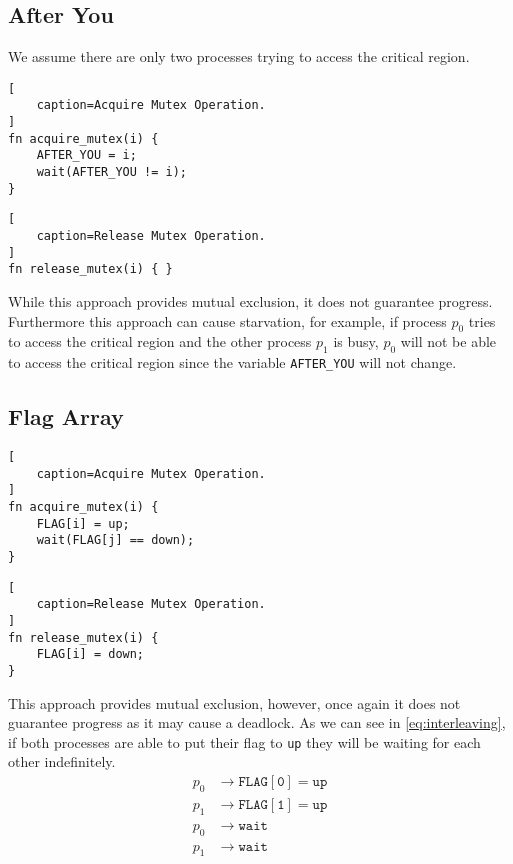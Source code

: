 \subsection{After You}

We assume there are only two processes trying to access the critical region.

\begin{lstlisting}[
    caption=Acquire Mutex Operation.
]
fn acquire_mutex(i) {
    AFTER_YOU = i;
    wait(AFTER_YOU != i);
}
\end{lstlisting}

\begin{lstlisting}[
    caption=Release Mutex Operation.
]
fn release_mutex(i) { }
\end{lstlisting}

While this approach provides mutual exclusion, it does not guarantee progress.
Furthermore this approach can cause starvation, for example,
if process $p_0$ tries to access the critical region and the other process $p_1$ is busy,
$p_0$ will not be able to access the critical region since the variable \texttt{AFTER\_YOU} will not change.

\subsection{Flag Array}

\begin{lstlisting}[
    caption=Acquire Mutex Operation.
]
fn acquire_mutex(i) {
    FLAG[i] = up;
    wait(FLAG[j] == down);
}
\end{lstlisting}

\begin{lstlisting}[
    caption=Release Mutex Operation.
]
fn release_mutex(i) {
    FLAG[i] = down;
}
\end{lstlisting}

This approach provides mutual exclusion, however, once again it does not guarantee progress as it may cause a deadlock.
As we can see in \autoref{eq:interleaving}, if both processes are able to put their flag to \texttt{up} they will be waiting for each other indefinitely.
\begin{equation}\label{eq:interleaving}
    \begin{split}
        p_0 & \rightarrow \mathtt{FLAG[0] = up}\\
        p_1 & \rightarrow \mathtt{FLAG[1] = up}\\
        p_0 & \rightarrow \mathtt{wait}\\
        p_1 & \rightarrow \mathtt{wait}\\
    \end{split}
\end{equation}

